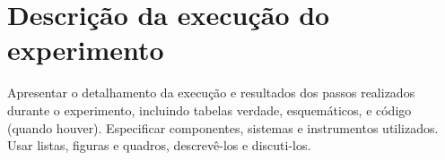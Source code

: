 
\chapter{Descrição da execução do experimento}
Apresentar   o   detalhamento   da  execução  e   resultados   dos   passos   realizados 
durante   o   experimento,   incluindo   tabelas   verdade,   esquemáticos,   e   código 
(quando  houver). 
Especificar  componentes,  sistemas  e  instrumentos  utilizados. 
Usar listas, figuras e quadros, descrevê-los e discuti-los.



